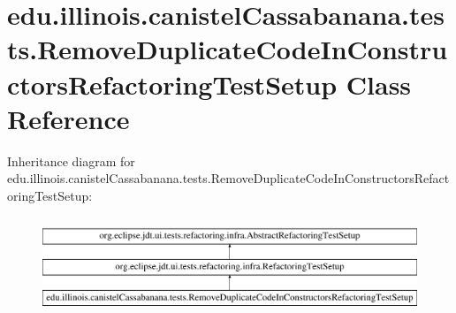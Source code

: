 \hypertarget{classedu_1_1illinois_1_1canistelCassabanana_1_1tests_1_1RemoveDuplicateCodeInConstructorsRefactoringTestSetup}{
\section{edu.illinois.canistelCassabanana.tests.RemoveDuplicateCodeInConstructorsRefactoringTestSetup Class Reference}
\label{classedu_1_1illinois_1_1canistelCassabanana_1_1tests_1_1RemoveDuplicateCodeInConstructorsRefactoringTestSetup}
}
Inheritance diagram for edu.illinois.canistelCassabanana.tests.RemoveDuplicateCodeInConstructorsRefactoringTestSetup:\begin{figure}[H]
\begin{center}
\leavevmode
\includegraphics[height=2.962963cm]{classedu_1_1illinois_1_1canistelCassabanana_1_1tests_1_1RemoveDuplicateCodeInConstructorsRefactoringTestSetup}
\end{center}
\end{figure}
